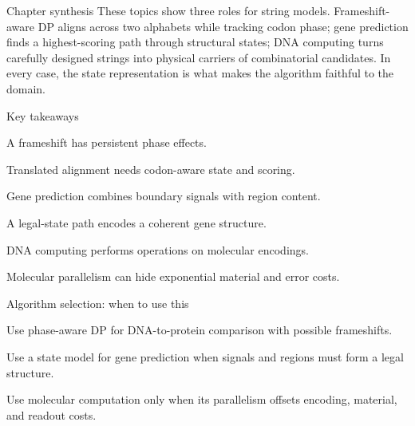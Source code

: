 \documentclass[11pt,letterpaper]{article}
\begin{document}
\begin{CornellNotesTable}
\end{CornellNotesTable}

\begin{CornellSummaryBox}{Chapter synthesis}
These topics show three roles for string models. Frameshift-aware DP aligns across two alphabets while tracking codon phase; gene prediction finds a highest-scoring path through structural states; DNA computing turns carefully designed strings into physical carriers of combinatorial candidates. In every case, the state representation is what makes the algorithm faithful to the domain.
\end{CornellSummaryBox}

\begin{CornellSummaryBox}{Key takeaways}
\begin{CornellRecallList}
  \item A frameshift has persistent phase effects.
  \item Translated alignment needs codon-aware state and scoring.
  \item Gene prediction combines boundary signals with region content.
  \item A legal-state path encodes a coherent gene structure.
  \item DNA computing performs operations on molecular encodings.
  \item Molecular parallelism can hide exponential material and error costs.
\end{CornellRecallList}
\end{CornellSummaryBox}

\begin{CornellOverviewBox}{Algorithm selection: when to use this}
\begin{CornellChecklist}
  \item Use phase-aware DP for DNA-to-protein comparison with possible frameshifts.
  \item Use a state model for gene prediction when signals and regions must form a legal structure.
  \item Use molecular computation only when its parallelism offsets encoding, material, and readout costs.
\end{CornellChecklist}
\end{CornellOverviewBox}
\end{document}
